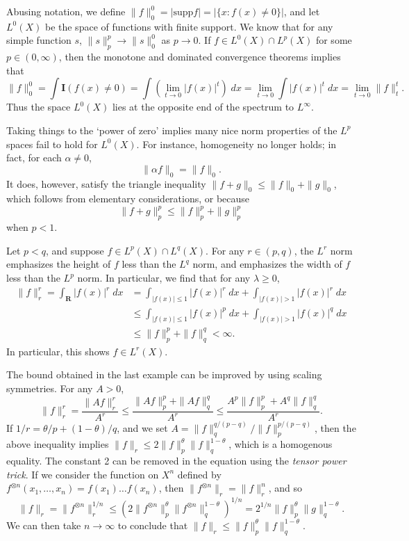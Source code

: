 Abusing notation, we define $\| f \|_0^0 = | \text{supp} f | = | \{ x: f(x) \neq 0 \} |$, and let $L^0(X)$ be the space of functions with finite support. We know that for any simple function $s$, $\| s \|_p^p \to \| s \|_0^0$ as $p \to 0$. If $f \in L^0(X) \cap L^p(X)$ for some $p \in (0,\infty)$, then the monotone and dominated convergence theorems implies that
%
\[ \| f \|_0^0 = \int \mathbf{I}(f(x) \neq 0) = \int \left( \lim_{t \to 0} |f(x)|^t \right)\; dx = \lim_{t \to 0} \int |f(x)|^t\; dx = \lim_{t \to 0} \| f \|_t^t. \]
%
Thus the space $L^0(X)$ lies at the opposite end of the spectrum to $L^\infty$.

Taking things to the `power of zero' implies many nice norm properties of the $L^p$ spaces fail to hold for $L^0(X)$. For instance, homogeneity no longer holds; in fact, for each $\alpha \neq 0$,
%
\[ \| \alpha f \|_0 = \| f \|_0. \]
%
It does, however, satisfy the triangle inequality $\| f + g \|_0 \leq \| f \|_0 + \| g \|_0$, which follows from elementary considerations, or because
%
\[ \| f + g \|_p^p \leq \| f \|_p^p + \| g \|_p^p \]
%
when $p < 1$.

\begin{example}
  Let $p < q$, and suppose $f \in L^p(X) \cap L^q(X)$. For any $r \in (p,q)$, the $L^r$ norm emphasizes the height of $f$ less than the $L^q$ norm, and emphasizes the width of $f$ less than the $L^p$ norm. In particular, we find that for any $\lambda \geq 0$,
  \begin{align*}
    \| f \|_r^r = \int_{\mathbf{R}} |f(x)|^r\; dx &= \int_{|f(x)| \leq 1} |f(x)|^r\; dx + \int_{|f(x)| > 1} |f(x)|^r\; dx\\
    &\leq \int_{|f(x)| \leq 1} |f(x)|^p\; dx + \int_{|f(x)| > 1} |f(x)|^q\; dx\\
    &\leq \| f \|_p^p + \| f \|_q^q < \infty.
  \end{align*}
  In particular, this shows $f \in L^r(X)$.
\end{example}

\begin{remark}
    The bound obtained in the last example can be improved by using scaling symmetries. For any $A > 0$,
    \[ \| f \|_r^r = \frac{\| Af \|_r^r}{A^r} \leq \frac{\| Af \|_p^p + \| Af \|_q^q}{A^r} \leq \frac{A^p \| f \|_p^p + A^q \| f \|_q^q}{A^r}. \]
    If $1/r = \theta/p + (1 - \theta)/q$, and we set $A = \| f \|_q^{q/(p-q)} / \| f \|_p^{p/(p-q)}$, then the above inequality implies $\| f \|_r \leq 2 \| f \|_p^\theta \| f \|_q^{1 - \theta}$, which is a homogenous equality. The constant 2 can be removed in the equation using the {\it tensor power trick}. If we consider the function on $X^n$ defined by $f^{\otimes n}(x_1, \dots, x_n) = f(x_1) \dots f(x_n)$, then $\| f^{\otimes n} \|_r = \| f \|_r^n$, and so
    \[ \| f \|_r = \| f^{\otimes n} \|_r^{1/n} \leq \left( 2 \| f^{\otimes n} \|_p^\theta \| f^{\otimes n} \|_q^{1-\theta} \right)^{1/n} = 2^{1/n} \| f \|_p^\theta \| g \|_q^{1-\theta}. \]
    We can then take $n \to \infty$ to conclude that $\| f \|_r \leq \| f \|_p^\theta \| f \|_q^{1-\theta}$.
\end{remark}

